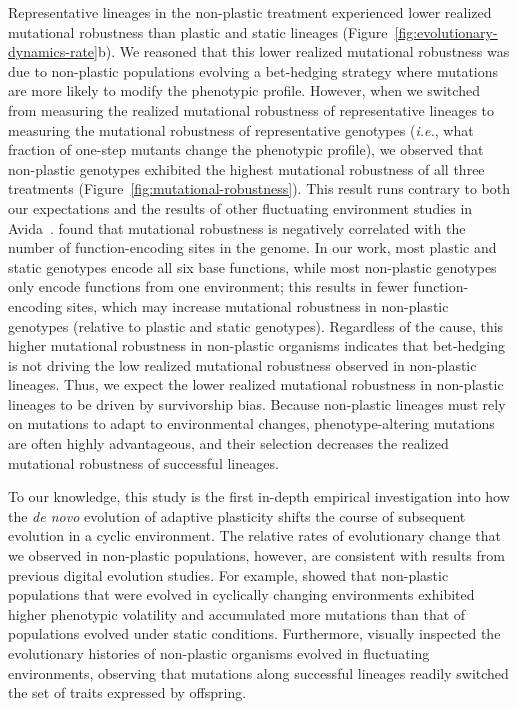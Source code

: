 \documentclass[utf8]{frontiersSCNS} %
\begin{document}
\begin{raggedbottom}
Representative lineages in the non-plastic treatment experienced lower realized mutational robustness than plastic and static lineages (Figure~\ref{fig:evolutionary-dynamics-rate}b).
We reasoned that this lower realized mutational robustness was due to non-plastic populations evolving a bet-hedging strategy where mutations are more likely to modify the phenotypic profile.
However, when we switched from measuring the realized mutational robustness of representative lineages to measuring the mutational robustness of representative genotypes (\textit{i.e.}, what fraction of one-step mutants change the phenotypic profile), we observed that non-plastic genotypes exhibited the highest mutational robustness of all three treatments (Figure~\ref{fig:mutational-robustness}).
This result runs contrary to both our expectations and the results of other fluctuating environment studies in Avida~\citep{canino-koning_fluctuating_2019}.
\cite{canino-koning_fluctuating_2019} found that mutational robustness is negatively correlated with the number of function-encoding sites in the genome.
In our work, most plastic and static genotypes encode all six base functions, while most non-plastic genotypes only encode functions from one environment; this results in fewer function-encoding sites, which may increase mutational robustness in non-plastic genotypes (relative to plastic and static genotypes). %
Regardless of the cause, this higher mutational robustness in non-plastic organisms indicates that bet-hedging is not driving the low realized mutational robustness observed in non-plastic lineages.
Thus, we expect the lower realized mutational robustness in non-plastic lineages to be driven by survivorship bias.
Because non-plastic lineages must rely on mutations to adapt to environmental changes, phenotype-altering mutations are often highly advantageous, and their selection decreases the realized mutational robustness of successful lineages.


To our knowledge, this study is the first in-depth empirical investigation into how the \textit{de novo} evolution of adaptive plasticity shifts the course of subsequent evolution in a cyclic environment.
The relative rates of evolutionary change that we observed in non-plastic populations, however, are consistent with results from previous digital evolution studies.
For example, \cite{dolson_interpreting_2020} showed that non-plastic populations that were evolved in cyclically changing environments exhibited higher phenotypic volatility and accumulated more mutations than that of populations evolved under static conditions.
Furthermore, \cite{lalejini_evolutionary_2016} visually inspected the evolutionary histories of non-plastic organisms evolved in fluctuating environments, observing that mutations along successful lineages readily switched the set of traits expressed by offspring.



\end{raggedbottom}
\end{document}
